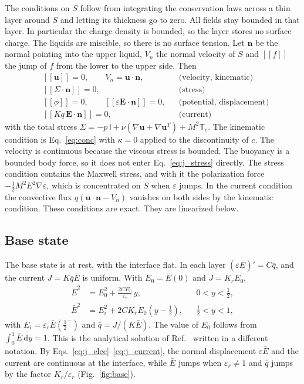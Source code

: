 \documentclass[aip,pof,reprint,amsmath,amssymb]{revtex4-2}
\newcommand{\bu}{\bm{u}}
\newcommand{\bE}{\bm{E}}
\newcommand{\dd}{\,\mathrm{d}}
\newcommand{\jump}[1]{[\![#1]\!]}
\begin{document}
The conditions on $S$ follow from integrating the conservation laws across a thin layer
around $S$ and letting its thickness go to zero. All fields stay bounded in that layer.
In particular the charge density is bounded, so the layer stores no surface charge. The
liquids are miscible, so there is no surface tension. Let $\bm n$ be the normal pointing
into the upper liquid, $V_n$ the normal velocity of $S$ and $\jump f$ the jump of $f$ from
the lower to the upper side. Then
\begin{align}
&\jump{\bu}=0, \qquad V_n=\bu\cdot\bm n, &&\text{(velocity, kinematic)}\label{eq:j_kin}\\
&\jump{\Sigma\cdot\bm n}=0, &&\text{(stress)}\label{eq:j_stress}\\
&\jump{\phi}=0,\qquad \jump{\varepsilon\bE\cdot\bm n}=0, &&\text{(potential, displacement)}
\label{eq:j_elec}\\
&\jump{Kq\,\bE\cdot\bm n}=0, &&\text{(current)}\label{eq:j_current}
\end{align}
with the total stress $\Sigma=-p\,\mathsf I+\nu\left(\nabla\bu+\nabla\bu^T\right)+M^2\mathsf
T_e$. The kinematic condition is Eq.~\eqref{eq:conc} with $\kappa=0$ applied to the
discontinuity of $c$. The velocity is continuous because the viscous stress is bounded.
The buoyancy is a bounded body force, so it does not enter Eq.~\eqref{eq:j_stress} directly.
The stress condition contains the Maxwell stress, and with it the polarization force
$-\tfrac12M^2E^2\nabla\varepsilon$, which is concentrated on $S$ when $\varepsilon$ jumps. In
the current condition the convective flux $q(\bu\cdot\bm n-V_n)$ vanishes on both sides by
the kinematic condition. These conditions are exact. They are linearized below.

\subsection{Base state}

The base state is at rest, with the interface flat. In each layer
$(\varepsilon\bar E)'=C\bar q$, and the current $J=K\bar q\bar E$ is uniform. With
$E_0=\bar E(0)$ and $J=K_rE_0$,
\begin{align}
\bar E^2&=E_0^2+\frac{2CE_0}{\varepsilon_r}\,y,&&0<y<\tfrac12,\\
\bar E^2&=E_i^2+2CK_rE_0\left(y-\tfrac12\right),&&\tfrac12<y<1,
\end{align}
with $E_i=\varepsilon_r\bar E(\tfrac12^-)$ and $\bar q=J/(K\bar E)$. The value of $E_0$
follows from $\int_0^1\bar E\dd y=1$. This is the analytical solution of
Ref.~ written in a different notation. By
Eqs.~\eqref{eq:j_elec}--\eqref{eq:j_current}, the normal displacement $\varepsilon\bar E$
and the current are continuous at the interface, while $\bar E$ jumps when
$\varepsilon_r\ne1$ and $\bar q$ jumps by the factor $K_r/\varepsilon_r$
(Fig.~\ref{fig:base}).
\end{document}
